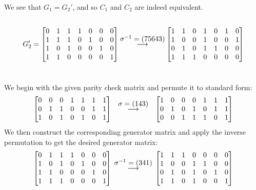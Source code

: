 \documentclass{article}
\begin{document}
We see that $G_1=G_2'$, and so $C_1$ and $C_2$ are indeed equivalent.
\subsection{} %
\begin{align*}
	G_2'=
	\begin{bmatrix}
		0 & 1 & 1 & 1 & 0 & 0 & 0\\
		1 & 1 & 1 & 0 & 1 & 0 & 0\\
		1 & 0 & 1 & 0 & 0 & 1 & 0\\
		1 & 1 & 0 & 0 & 0 & 0 & 1
	\end{bmatrix}
	\qquad\;\stackrel{\mathclap{\normalfont\mbox{$\sigma^{-1}=(75643)$}}}{\longrightarrow}\qquad\;
	\begin{bmatrix}
		1 & 1 & 0 & 1 & 0 & 1 & 0\\
		1 & 0 & 0 & 1 & 0 & 0 & 1\\
		0 & 1 & 0 & 1 & 1 & 0 & 0\\
		1 & 1 & 1 & 0 & 0 & 0 & 0
	\end{bmatrix}
\end{align*}

\section{} %
We begin with the given parity check matrix and permute it to standard form:
\begin{align*}
	\begin{bmatrix}
		0 & 0 & 0 & 1 & 1 & 1 & 1\\
		0 & 1 & 1 & 0 & 0 & 1 & 1\\
		1 & 0 & 1 & 0 & 1 & 0 & 1
	\end{bmatrix}
	\qquad\stackrel{\mathclap{\normalfont\mbox{$\sigma=(143)$}}}{\longrightarrow}\qquad
	\begin{bmatrix}
		1 & 0 & 0 & 0 & 1 & 1 & 1\\
		0 & 1 & 0 & 1 & 0 & 1 & 1\\
		0 & 0 & 1 & 1 & 1 & 0 & 1
	\end{bmatrix}\\
\end{align*}
We then construct the corresponding generator matrix and apply the inverse
permutation to get the desired generator matrix:
\begin{align*}
	\begin{bmatrix}
		0 & 1 & 1 & 1 & 0 & 0 & 0\\
		1 & 0 & 1 & 0 & 1 & 0 & 0\\
		1 & 1 & 0 & 0 & 0 & 1 & 0\\
		1 & 1 & 1 & 0 & 0 & 0 & 1
	\end{bmatrix}
	\qquad\stackrel{\mathclap{\normalfont\mbox{$\sigma^{-1}=(341)$}}}{\longrightarrow}\qquad
	\begin{bmatrix}
		1 & 1 & 1 & 0 & 0 & 0 & 0\\
		1 & 0 & 0 & 1 & 1 & 0 & 0\\
		0 & 1 & 0 & 1 & 0 & 1 & 0\\
		1 & 1 & 0 & 1 & 0 & 0 & 1
	\end{bmatrix}
\end{align*}
\end{document}
